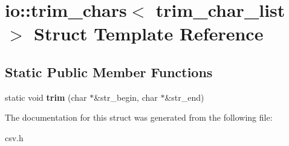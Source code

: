 \section{io\+:\+:trim\+\_\+chars$<$ trim\+\_\+char\+\_\+list $>$ Struct Template Reference}
\label{structio_1_1trim__chars}
\subsection*{Static Public Member Functions}
\begin{DoxyCompactItemize}
\item 
static void {\bfseries trim} (char $\ast$\&str\+\_\+begin, char $\ast$\&str\+\_\+end)\label{structio_1_1trim__chars_a4cffc5e839ab4024ca8c8330e26e338c}

\end{DoxyCompactItemize}


The documentation for this struct was generated from the following file\+:\begin{DoxyCompactItemize}
\item 
csv.\+h\end{DoxyCompactItemize}
